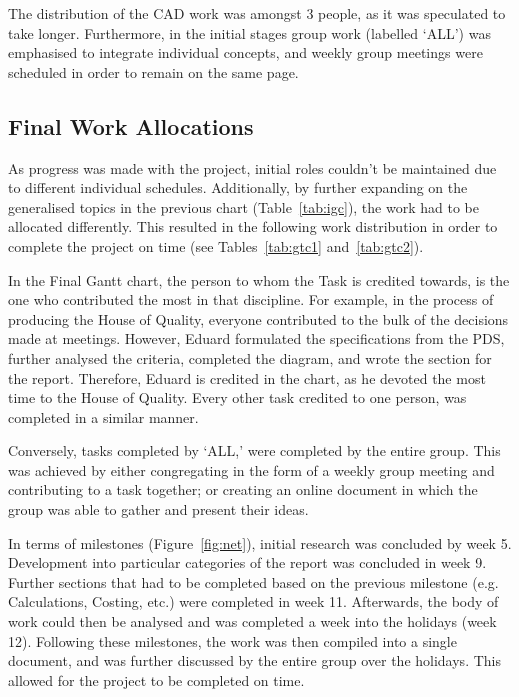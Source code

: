 \documentclass[a4paper,11pt]{article}
\begin{document}
The distribution of the CAD work was amongst 3 people, as it was speculated to take longer. Furthermore, in the initial stages group work (labelled `ALL') was emphasised to integrate individual concepts, and weekly group meetings were scheduled in order to remain on the same page.

\subsection{Final Work Allocations}
\label{sec:fwa}

As progress was made with the project, initial roles couldn't be maintained due to different individual schedules. Additionally, by further expanding on the generalised topics in the previous chart (Table~\ref{tab:igc}), the work had to be allocated differently. This resulted in the following work distribution in order to complete the project on time (see Tables~\ref{tab:gtc1} and~\ref{tab:gtc2}).

In the Final Gantt chart, the person to whom the Task is credited towards, is the one who contributed the most in that discipline. For example, in the process of producing the House of Quality, everyone contributed to the bulk of the decisions made at meetings. However, Eduard formulated the specifications from the PDS, further analysed the criteria, completed the diagram, and wrote the section for the report. Therefore, Eduard is credited in the chart, as he devoted the most time to the House of Quality. Every other task credited to one person, was completed in a similar manner.

Conversely, tasks completed by `ALL,' were completed by the entire group. This was achieved by either congregating in the form of a weekly group meeting and contributing to a task together; or creating an online document in which the group was able to gather and present their ideas.

In terms of milestones (Figure~\ref{fig:net}), initial research was concluded by week 5. Development into particular categories of the report was concluded in week 9. Further sections that had to be completed based on the previous milestone (e.g. Calculations, Costing, etc.) were completed in week 11. Afterwards, the body of work could then be analysed and was completed a week into the holidays (week 12). Following these milestones, the work was then compiled into a single document, and was further discussed by the entire group over the holidays. This allowed for the project to be completed on time.
\end{document}
